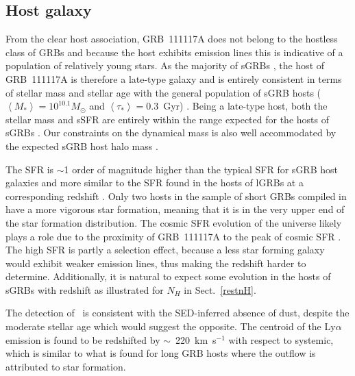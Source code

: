\documentclass{aa}    %
\begin{document}

\subsection{Host galaxy}

From the clear host association, GRB~111117A does not belong to the hostless
class of GRBs \citep{Berger2010a} and because the host exhibits emission lines
this is indicative of a population of relatively young stars. As the majority of
sGRBs \citep{Fong2013b}, the host of GRB~111117A is therefore a late-type galaxy
and is entirely consistent in terms of stellar mass and stellar age with the
general population of sGRB hosts ($\left\langle M _* \right\rangle = 10^{10.1}
M_{\odot}$ and $\left\langle \tau _* \right\rangle = 0.3 $~Gyr)
\citep{Leibler2010}. Being a late-type host, both the stellar mass and sSFR are
entirely within the range expected for the hosts of sGRBs \citep{Behroozi2014}.
Our constraints on the dynamical mass is also well accommodated by the expected sGRB
host halo mass \citep{Behroozi2014}.

The SFR is $\sim$1 order of magnitude higher than the typical SFR for sGRB host
galaxies \citep{Berger2014} and more similar to the SFR found in the hosts of
lGRBs at a corresponding redshift \citep{Kruhler2015}. Only two hosts in the
sample of short GRBs compiled in \citet{Berger2014} have a more vigorous star
formation, meaning that it is in the very upper end of the star formation
distribution. The cosmic SFR evolution of the universe likely plays a role due
to the proximity of GRB~111117A to the peak of cosmic SFR \citep{Madau2014}.
The high SFR is partly a selection effect, because a less star forming galaxy
would exhibit weaker emission lines, thus making the redshift harder to
determine. Additionally, it is natural to expect some evolution in the hosts of
sGRBs with redshift as illustrated for $N_H$ in Sect.~\ref{restnH}.

The detection of \lya~is consistent with the SED-inferred absence of dust,
despite the moderate stellar age which would suggest the opposite. The centroid
of the Ly$\alpha$ emission is found to be redshifted by $\sim$~220~km~s$^{-1}$
with respect to systemic, which is similar to what is found for long GRB hosts
\citep{Milvang-Jensen2012a} where the outflow is attributed to star formation.
\end{document}
